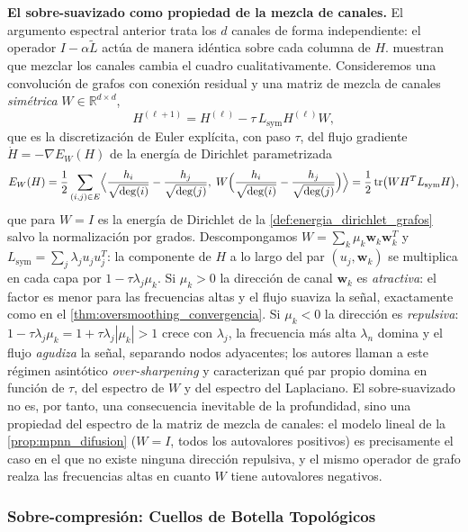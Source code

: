 \textbf{El sobre-suavizado como propiedad de la mezcla de canales.} El argumento espectral anterior trata los $d$ canales de forma independiente: el operador $I - \alpha\tilde{L}$ actúa de manera idéntica sobre cada columna de $H$. \citet{digiovanni2023energies} muestran que mezclar los canales cambia el cuadro cualitativamente. Consideremos una convolución de grafos con conexión residual y una matriz de mezcla de canales \textit{simétrica} $W \in \mathbb{R}^{d \times d}$,
\begin{equation}\label{eq:flujo_gradiente_conv}
	H^{(\ell+1)} = H^{(\ell)} - \tau\, L_{\mathrm{sym}} H^{(\ell)} W,
\end{equation}
que es la discretización de Euler explícita, con paso $\tau$, del flujo gradiente $\dot{H} = -\nabla E_W(H)$ de la energía de Dirichlet parametrizada
\[
	E_W(H) = \frac{1}{2}\sum_{(i,j) \in E}\Bigl\langle \frac{h_i}{\sqrt{\deg(i)}} - \frac{h_j}{\sqrt{\deg(j)}},\; W\Bigl(\frac{h_i}{\sqrt{\deg(i)}} - \frac{h_j}{\sqrt{\deg(j)}}\Bigr)\Bigr\rangle = \frac{1}{2}\operatorname{tr}\bigl(W H^T L_{\mathrm{sym}} H\bigr),
\]
que para $W = I$ es la energía de Dirichlet de la \autoref{def:energia_dirichlet_grafos} salvo la normalización por grados. Descompongamos $W = \sum_{k} \mu_k \mathbf{w}_k \mathbf{w}_k^T$ y $L_{\mathrm{sym}} = \sum_{j} \lambda_j u_j u_j^T$: la componente de $H$ a lo largo del par $(u_j, \mathbf{w}_k)$ se multiplica en cada capa por $1 - \tau\lambda_j\mu_k$. Si $\mu_k > 0$ la dirección de canal $\mathbf{w}_k$ es \textit{atractiva}: el factor es menor para las frecuencias altas y el flujo suaviza la señal, exactamente como en el \autoref{thm:oversmoothing_convergencia}. Si $\mu_k < 0$ la dirección es \textit{repulsiva}: $1 - \tau\lambda_j\mu_k = 1 + \tau\lambda_j|\mu_k| > 1$ crece con $\lambda_j$, la frecuencia más alta $\lambda_n$ domina y el flujo \textit{agudiza} la señal, separando nodos adyacentes; los autores llaman a este régimen asintótico \textit{over-sharpening} y caracterizan qué par propio domina en función de $\tau$, del espectro de $W$ y del espectro del Laplaciano. El sobre-suavizado no es, por tanto, una consecuencia inevitable de la profundidad, sino una propiedad del espectro de la matriz de mezcla de canales: el modelo lineal de la \autoref{prop:mpnn_difusion} ($W = I$, todos los autovalores positivos) es precisamente el caso en el que no existe ninguna dirección repulsiva, y el mismo operador de grafo realza las frecuencias altas en cuanto $W$ tiene autovalores negativos.

\subsubsection{Sobre-compresión: Cuellos de Botella Topológicos}\label{subsubsec:oversquashing}

